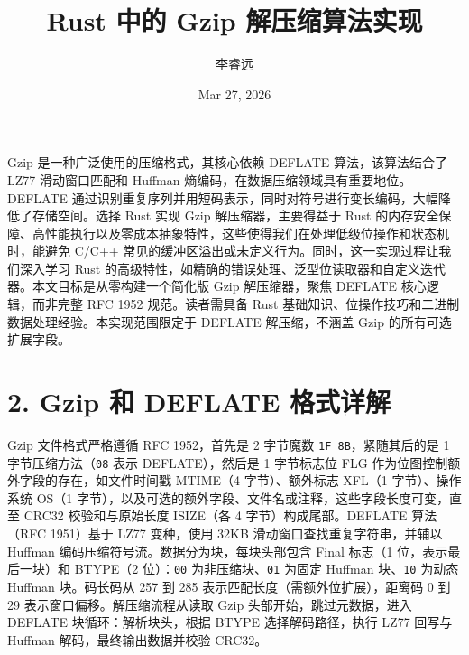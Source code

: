 \title{Rust 中的 Gzip 解压缩算法实现}
\author{李睿远}
\date{Mar 27, 2026}
\maketitle
Gzip 是一种广泛使用的压缩格式，其核心依赖 DEFLATE 算法，该算法结合了 LZ77 滑动窗口匹配和 Huffman 熵编码，在数据压缩领域具有重要地位。DEFLATE 通过识别重复序列并用短码表示，同时对符号进行变长编码，大幅降低了存储空间。选择 Rust 实现 Gzip 解压缩器，主要得益于 Rust 的内存安全保障、高性能执行以及零成本抽象特性，这些使得我们在处理低级位操作和状态机时，能避免 C/C++ 常见的缓冲区溢出或未定义行为。同时，这一实现过程让我们深入学习 Rust 的高级特性，如精确的错误处理、泛型位读取器和自定义迭代器。本文目标是从零构建一个简化版 Gzip 解压缩器，聚焦 DEFLATE 核心逻辑，而非完整 RFC 1952 规范。读者需具备 Rust 基础知识、位操作技巧和二进制数据处理经验。本实现范围限定于 DEFLATE 解压缩，不涵盖 Gzip 的所有可选扩展字段。\par
\chapter{2. Gzip 和 DEFLATE 格式详解}
Gzip 文件格式严格遵循 RFC 1952，首先是 2 字节魔数 \texttt{1F 8B}，紧随其后的是 1 字节压缩方法（\texttt{08} 表示 DEFLATE），然后是 1 字节标志位 FLG 作为位图控制额外字段的存在，如文件时间戳 MTIME（4 字节）、额外标志 XFL（1 字节）、操作系统 OS（1 字节），以及可选的额外字段、文件名或注释，这些字段长度可变，直至 CRC32 校验和与原始长度 ISIZE（各 4 字节）构成尾部。DEFLATE 算法（RFC 1951）基于 LZ77 变种，使用 32KB 滑动窗口查找重复字符串，并辅以 Huffman 编码压缩符号流。数据分为块，每块头部包含 Final 标志（1 位，表示最后一块）和 BTYPE（2 位）：\texttt{00} 为非压缩块、\texttt{01} 为固定 Huffman 块、\texttt{10} 为动态 Huffman 块。码长码从 257 到 285 表示匹配长度（需额外位扩展），距离码 0 到 29 表示窗口偏移。解压缩流程从读取 Gzip 头部开始，跳过元数据，进入 DEFLATE 块循环：解析块头，根据 BTYPE 选择解码路径，执行 LZ77 回写与 Huffman 解码，最终输出数据并校验 CRC32。\par
